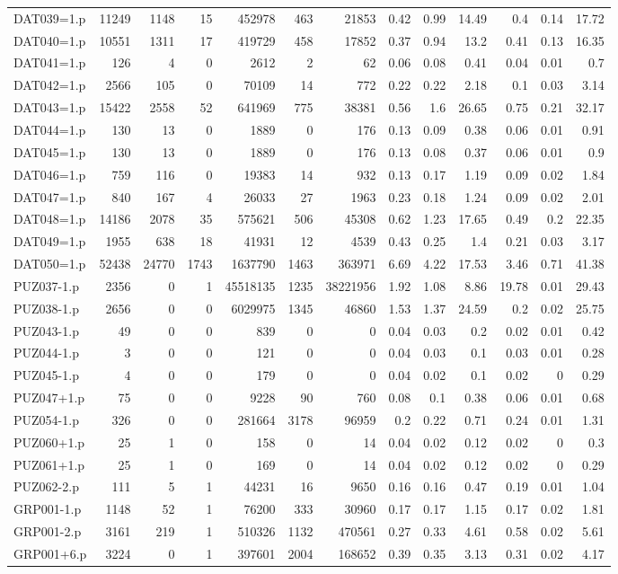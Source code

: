\begin{table}[H]
\begin{adjustwidth}{-0.4in}{-0.5in}
\begin{tabular}{| l || r | r | r || r | r | r || r | r | r | r | r | r |}
DAT039=1.p&11249&1148&15&452978&463&21853&0.42&0.99&14.49&0.4&0.14&17.72\\
DAT040=1.p&10551&1311&17&419729&458&17852&0.37&0.94&13.2&0.41&0.13&16.35\\
DAT041=1.p&126&4&0&2612&2&62&0.06&0.08&0.41&0.04&0.01&0.7\\
DAT042=1.p&2566&105&0&70109&14&772&0.22&0.22&2.18&0.1&0.03&3.14\\
DAT043=1.p&15422&2558&52&641969&775&38381&0.56&1.6&26.65&0.75&0.21&32.17\\
DAT044=1.p&130&13&0&1889&0&176&0.13&0.09&0.38&0.06&0.01&0.91\\
DAT045=1.p&130&13&0&1889&0&176&0.13&0.08&0.37&0.06&0.01&0.9\\
DAT046=1.p&759&116&0&19383&14&932&0.13&0.17&1.19&0.09&0.02&1.84\\
DAT047=1.p&840&167&4&26033&27&1963&0.23&0.18&1.24&0.09&0.02&2.01\\
DAT048=1.p&14186&2078&35&575621&506&45308&0.62&1.23&17.65&0.49&0.2&22.35\\
DAT049=1.p&1955&638&18&41931&12&4539&0.43&0.25&1.4&0.21&0.03&3.17\\
DAT050=1.p&52438&24770&1743&1637790&1463&363971&6.69&4.22&17.53&3.46&0.71&41.38\\
PUZ037-1.p&2356&0&1&45518135&1235&38221956&1.92&1.08&8.86&19.78&0.01&29.43\\
PUZ038-1.p&2656&0&0&6029975&1345&46860&1.53&1.37&24.59&0.2&0.02&25.75\\
PUZ043-1.p&49&0&0&839&0&0&0.04&0.03&0.2&0.02&0.01&0.42\\
PUZ044-1.p&3&0&0&121&0&0&0.04&0.03&0.1&0.03&0.01&0.28\\
PUZ045-1.p&4&0&0&179&0&0&0.04&0.02&0.1&0.02&0&0.29\\
PUZ047+1.p&75&0&0&9228&90&760&0.08&0.1&0.38&0.06&0.01&0.68\\
PUZ054-1.p&326&0&0&281664&3178&96959&0.2&0.22&0.71&0.24&0.01&1.31\\
PUZ060+1.p&25&1&0&158&0&14&0.04&0.02&0.12&0.02&0&0.3\\
PUZ061+1.p&25&1&0&169&0&14&0.04&0.02&0.12&0.02&0&0.29\\
PUZ062-2.p&111&5&1&44231&16&9650&0.16&0.16&0.47&0.19&0.01&1.04\\
GRP001-1.p&1148&52&1&76200&333&30960&0.17&0.17&1.15&0.17&0.02&1.81\\
GRP001-2.p&3161&219&1&510326&1132&470561&0.27&0.33&4.61&0.58&0.02&5.61\\
GRP001+6.p&3224&0&1&397601&2004&168652&0.39&0.35&3.13&0.31&0.02&4.17\\

\end{tabular}
\end{adjustwidth}
\end{table}
